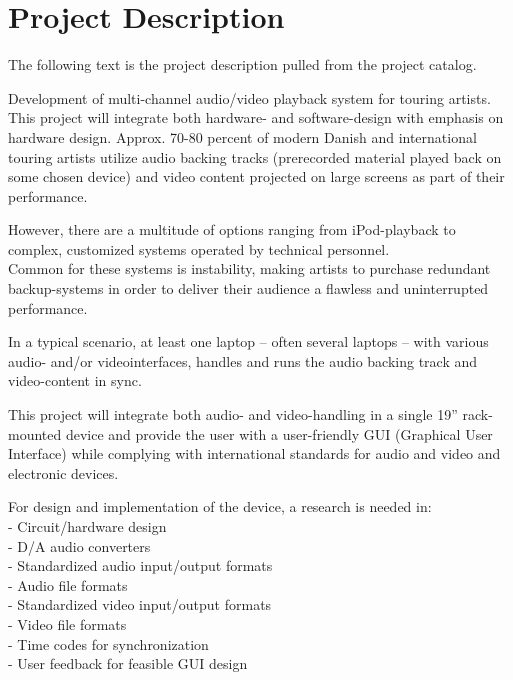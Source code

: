 \chapter{Project Description}
The following text is the project description pulled from the project catalog. \newline

Development of multi-channel audio/video playback system for touring artists. This project will
integrate both hardware- and software-design with emphasis on hardware design.
Approx. 70-80 percent of modern Danish and international touring artists utilize audio backing tracks
(prerecorded material played back on some chosen device) and video content projected on large
screens as part of their performance. \newline

However, there are a multitude of options ranging from iPod-playback to complex, customized
systems operated by technical personnel. \\
Common for these systems is instability, making artists to purchase redundant backup-systems in
order to deliver their audience a flawless and uninterrupted performance. \newline

In a typical scenario, at least one laptop – often several laptops – with various audio- and/or videointerfaces, handles and runs the audio backing track and video-content in sync. \newline

This project will integrate both audio- and video-handling in a single 19” rack-mounted device and
provide the user with a user-friendly GUI (Graphical User Interface) while complying with
international standards for audio and video and electronic devices. \newline

For design and implementation of the device, a research is needed in: \\
- Circuit/hardware design \\
- D/A audio converters \\
- Standardized audio input/output formats \\
- Audio file formats \\
- Standardized video input/output formats \\
- Video file formats \\
- Time codes for synchronization \\
- User feedback for feasible GUI design \newline

